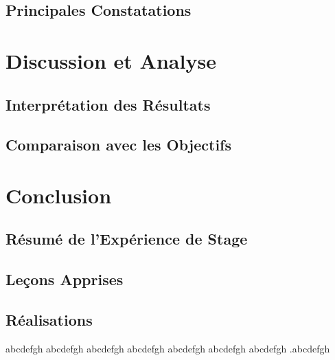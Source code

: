\documentclass[12pt,a4paper]{report}
\begin{document}
\section{Principales Constatations}

\chapter{Discussion et Analyse}
\section{Interprétation des Résultats}

\section{Comparaison avec les Objectifs}

\chapter{Conclusion}
\section{Résumé de l'Expérience de Stage}

\section{Leçons Apprises}

\section{Réalisations}

\begin{thebibliography}{99}
    \bibitem[1] abcdefgh
    \bibitem[2] abcdefgh
    \bibitem[3] abcdefgh
    \bibitem[4] abcdefgh
    \bibitem[5] abcdefgh
    \bibitem[6] abcdefgh
    \bibitem[7] abcdefgh
    \bibitem[8] .abcdefgh
\end{thebibliography}
\end{document}
